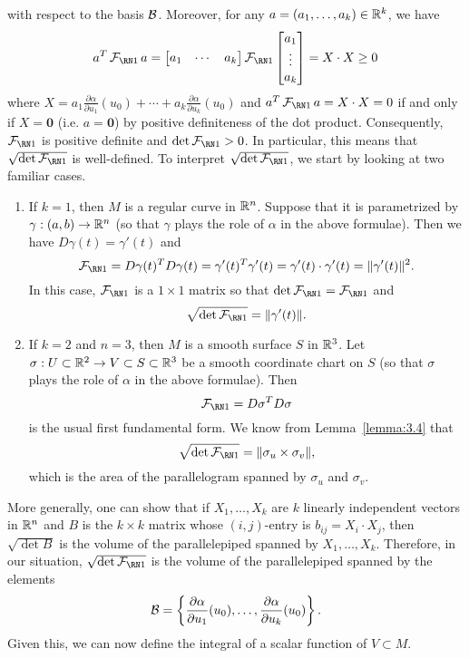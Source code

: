 with respect to the basis ${\cal B}$. Moreover, for any 
$a = (a_1, \dots, a_k) \in \mathbb{R}^k$, we have 
\[ a^T \FFF a = \begin{bmatrix}
    a_1 & \cdots & a_k 
\end{bmatrix} \FFF \begin{bmatrix}
    a_1 \\ \vdots \\ a_k 
\end{bmatrix} = X \cdot X \geq 0 \] 
where $X = a_1 \frac{\partial\alpha}{\partial u_1}(u_0) + \cdots 
+ a_k \frac{\partial\alpha}{\partial u_k}(u_0)$ and $a^T \FFF a = X \cdot X = 0$ 
if and only if $X = \mathbf 0$ (i.e. $a = \mathbf 0$) by positive 
definiteness of the dot product. Consequently, $\FFF$ is positive 
definite and $\det\FFF > 0$. In particular, this means that 
$\sqrt{\det\FFF}$ is well-defined. To interpret $\sqrt{\det\FFF}$, we 
start by looking at two familiar cases. 
\begin{enumerate}[(1)]
    \item If $k = 1$, then $M$ is a regular curve in $\mathbb{R}^n$. Suppose that 
    it is parametrized by $\gamma : (a, b) \to \mathbb{R}^n$ (so that $\gamma$ 
    plays the role of $\alpha$ in the above formulae). Then we have 
    $D\gamma(t) = \gamma'(t)$ and 
    \[ \FFF = D\gamma(t)^T D\gamma(t) = \gamma'(t)^T \gamma'(t) 
    = \gamma'(t) \cdot \gamma'(t) = \|\gamma'(t)\|^2. \] 
    In this case, $\FFF$ is a $1 \times 1$ matrix so that 
    $\det\FFF = \FFF$ and 
    \[ \sqrt{\det\FFF} = \|\gamma'(t)\|. \] 
    
    \item If $k = 2$ and $n = 3$, then $M$ is a smooth surface $S$ in $\mathbb{R}^3$. 
    Let $\sigma : U \subset \mathbb{R}^2 \to V \subset S \subset \mathbb{R}^3$ be a smooth 
    coordinate chart on $S$ (so that $\sigma$ plays the role of $\alpha$ 
    in the above formulae). Then 
    \[ \FFF = D\sigma^T D\sigma \] 
    is the usual first fundamental form. We know from Lemma~\ref{lemma:3.4} that 
    \[ \sqrt{\det\FFF} = \|\sigma_u \times \sigma_v\|, \] 
    which is the area of the parallelogram spanned by $\sigma_u$ and $\sigma_v$. 
\end{enumerate}

More generally, one can show that if $X_1, \dots, X_k$ are $k$ linearly 
independent vectors in $\mathbb{R}^n$ and $B$ is the $k \times k$ matrix whose 
$(i, j)$-entry is $b_{ij} = X_i \cdot X_j$, then 
$\sqrt{\det B}$ is the volume of the parallelepiped spanned by $X_1, \dots, X_k$. 
Therefore, in our situation, $\sqrt{\det\FFF}$ is the volume of the 
parallelepiped spanned by the elements 
\[ {\cal B} = \left\{ \frac{\partial\alpha}{\partial u_1}(u_0), 
\dots, \frac{\partial\alpha}{\partial u_k}(u_0) \right\}. \] 
Given this, we can now define the integral of a scalar function of $V \subset M$. 


